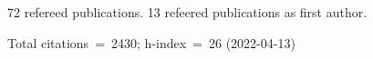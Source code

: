 72 refereed publications. 13 refeered publications as first author.

Total citations~=~2430; h-index~=~26 (2022-04-13)